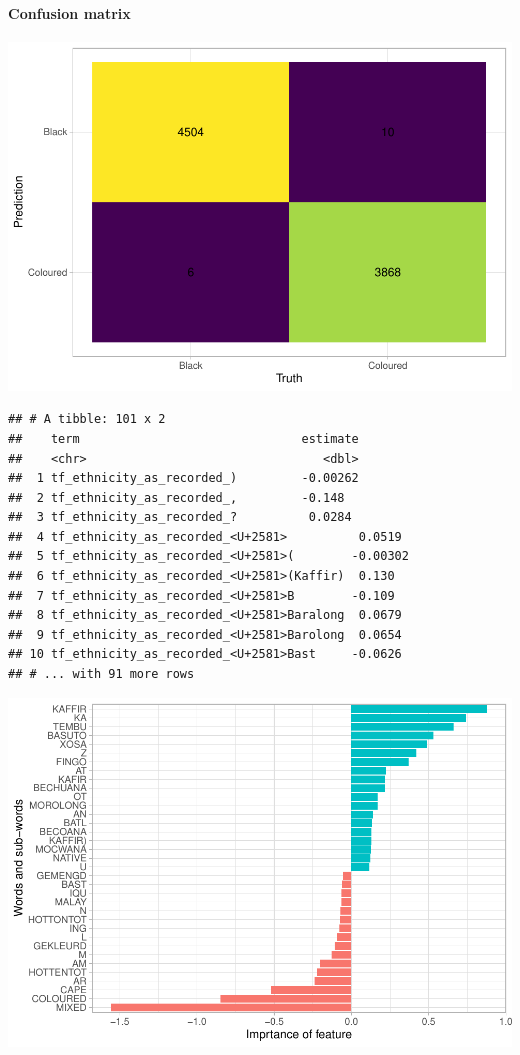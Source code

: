 \documentclass[fleqn,10pt,lineno]{wlpeerj} %
\begin{document}
\hypertarget{confusion-matrix}{%
\paragraph{Confusion matrix}\label{confusion-matrix}}

\includegraphics{spanish-flu-mortality_bookdown_files/figure-latex/unnamed-chunk-38-1.pdf}

\begin{verbatim}
## # A tibble: 101 x 2
##    term                               estimate
##    <chr>                                 <dbl>
##  1 tf_ethnicity_as_recorded_)         -0.00262
##  2 tf_ethnicity_as_recorded_,         -0.148  
##  3 tf_ethnicity_as_recorded_?          0.0284 
##  4 tf_ethnicity_as_recorded_<U+2581>          0.0519 
##  5 tf_ethnicity_as_recorded_<U+2581>(        -0.00302
##  6 tf_ethnicity_as_recorded_<U+2581>(Kaffir)  0.130  
##  7 tf_ethnicity_as_recorded_<U+2581>B        -0.109  
##  8 tf_ethnicity_as_recorded_<U+2581>Baralong  0.0679 
##  9 tf_ethnicity_as_recorded_<U+2581>Barolong  0.0654 
## 10 tf_ethnicity_as_recorded_<U+2581>Bast     -0.0626 
## # ... with 91 more rows
\end{verbatim}

\includegraphics{spanish-flu-mortality_bookdown_files/figure-latex/unnamed-chunk-39-1.pdf}
\end{document}
